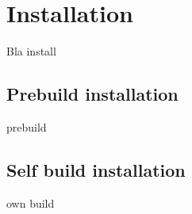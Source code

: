 \section{Installation}
Bla install

\subsection{Prebuild installation}
prebuild

\subsection{Self build installation}
own build

\newpage
